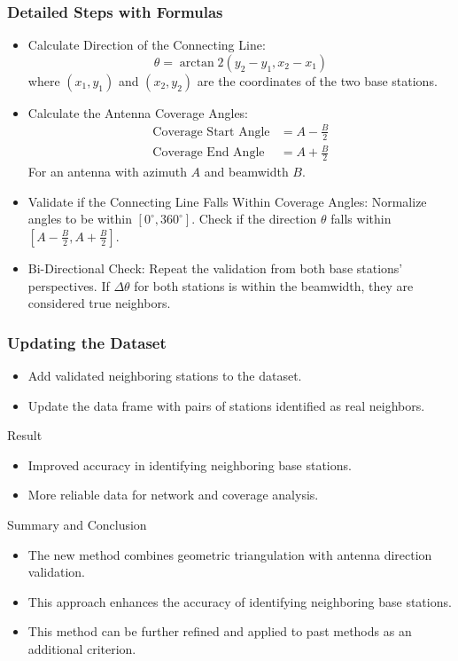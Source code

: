 \begin{frame}
    \frametitle{Detailed Steps with Formulas}
    \begin{itemize}
        \item Calculate Direction of the Connecting Line:
        \[ \theta = \arctan2(y_2 - y_1, x_2 - x_1) \]
        where \((x_1, y_1)\) and \((x_2, y_2)\) are the coordinates of the two base stations.
        
        \item Calculate the Antenna Coverage Angles:
        \begin{align*}
        \text{Coverage Start Angle} &= A - \frac{B}{2} \\
        \text{Coverage End Angle} &= A + \frac{B}{2}
        \end{align*}
        For an antenna with azimuth \(A\) and beamwidth \(B\).

        \item Validate if the Connecting Line Falls Within Coverage Angles:
        Normalize angles to be within \([0^\circ, 360^\circ]\).
        Check if the direction \(\theta\) falls within \([A - \frac{B}{2}, A + \frac{B}{2}]\).

        \item Bi-Directional Check:
        Repeat the validation from both base stations' perspectives.
        If \(\Delta \theta\) for both stations is within the beamwidth, they are considered true neighbors.
    \end{itemize}
\end{frame}


\begin{frame}
    \frametitle{Updating the Dataset}
    \begin{itemize}
        \item Add validated neighboring stations to the dataset.
        \item Update the data frame with pairs of stations identified as real neighbors.
    \end{itemize}
    \begin{block}{Result}
        \begin{itemize}
            \item Improved accuracy in identifying neighboring base stations.
            \item More reliable data for network and coverage analysis.
        \end{itemize}
    \end{block}
    \begin{block}{Summary and Conclusion}
        \begin{itemize}
            \item The new method combines geometric triangulation with antenna direction validation.
            \item This approach enhances the accuracy of identifying neighboring base stations.
            \item This method can be further refined and applied to past methods as an additional criterion.
        \end{itemize}
    \end{block}
\end{frame}